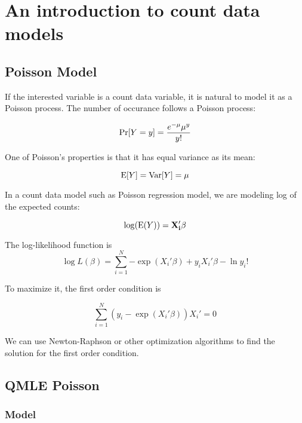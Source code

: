 \chapter{An introduction to count data models}

\section{Poisson Model}
  
If the interested variable is a count data variable, it is natural to model it as a Poisson process.  The number of occurance follows a Poisson process:

\begin{equation}
{\rm Pr} [Y=y]=\frac{e^{-\mu} \mu^y}{y! }
\end{equation}

One of Poisson's properties is that it has equal variance as its mean:

\begin{equation}
{\rm E} [Y]={\rm Var} [Y]=\mu
\end{equation}


In a count data model such as Poisson regression model, we are modeling log of the expected counts:

\begin{equation}
\log ({\rm E}( Y) )=\bf X_i' \beta
\end{equation}

The log-likelihood function is
\begin{equation}
\log L(\beta)= \sum_{i=1}^N {- \exp (X_i' \beta) + y_i X_i' \beta - \ln y_i!}
\end{equation}

To maximize it, the first order condition is

\begin{equation}
\sum_{i=1}^N (y_i - \exp (X_i' \beta) )X_i'=0 \label{first_order}
\end{equation}

We can use Newton-Raphson or other optimization algorithms to find the solution for the first order condition.  


\section{QMLE Poisson }

\subsection{Model}

